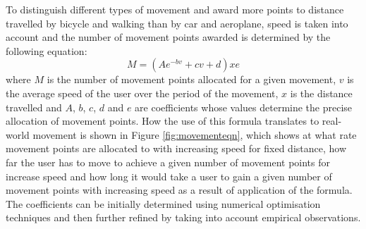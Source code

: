 \documentclass[12pt,a4paper,twoside]{article}
\begin{document}
To distinguish different types of movement and award more points to distance travelled by bicycle and walking than by car and aeroplane, speed is taken into account and the number of movement points awarded is determined by the following equation:
\begin{equation}
\label{eq:mpoints}
M = \left({Ae^{-bv}+cv+d}\right)xe
\end{equation}
where $M$ is the number of movement points allocated for a given movement, $v$ is the average speed of the user over the period of the movement, $x$ is the distance travelled and $A$, $b$, $c$, $d$ and $e$ are coefficients whose values determine the precise allocation of movement points. How the use of this formula translates to real-world movement is shown in Figure \ref{fig:movementeqn}, which shows at what rate movement points are allocated to with increasing speed for fixed distance, how far the user has to move to achieve a given number of movement points for increase speed and how long it would take a user to gain a given number of movement points with increasing speed as a result of application of the formula. The coefficients can be initially determined using numerical optimisation techniques and then further refined by taking into account empirical observations.
\end{document}
